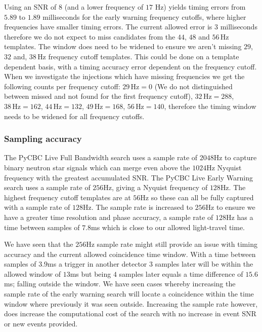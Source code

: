 %
Using an SNR of $8$ (and a lower frequency of $17$ Hz) yields timing errors from $5.89$ to $1.89$ milliseconds for the early warning frequency cutoffs, where higher frequencies have smaller timing errors. The current allowed error is $3$ milliseconds therefore we do not expect to miss candidates from the $44$, $48$ and $56 \, \text{Hz}$ templates. The window does need to be widened to ensure we aren't missing $29$, $32$ and, $38 \, \text{Hz}$ frequency cutoff templates. This could be done on a template dependent basis, with a timing accuracy error dependent on the frequency cutoff. When we investigate the injections which have missing frequencies we get the following counts per frequency cutoff: $29 \, \text{Hz} = 0$ (We do not distinguished between missed and not found for the first frequency cutoff), $32 \, \text{Hz} = 288$, $38 \, \text{Hz} = 162$, $44 \, \text{Hz} = 132$, $49 \, \text{Hz} = 168$, $56 \, \text{Hz} = 140$, therefore the timing window needs to be widened for all frequency cutoffs.

\subsubsection{\label{6:sec:sample_accuracy}Sampling accuracy}

The PyCBC Live Full Bandwidth search uses a sample rate of $2048$Hz to capture binary neutron star signals which can merge even above the $1024$Hz Nyquist frequency with the greatest accumulated SNR. The PyCBC Live Early Warning search uses a sample rate of $256$Hz, giving a Nyquist frequency of $128$Hz. The highest frequency cutoff templates are at $56$Hz so these can all be fully captured with a sample rate of $128$Hz. The sample rate is increased to $256$Hz to ensure we have a greater time resolution and phase accuracy, a sample rate of $128$Hz has a time between samples of $7.8$ms which is close to our allowed light-travel time.

We have seen that the $256$Hz sample rate might still provide an issue with timing accuracy and the current allowed coincidence time window. With a time between samples of $3.9$ms a trigger in another detector $3$ samples later will be within the allowed window of $13$ms but being $4$ samples later equals a time difference of $15.6$ms; falling outside the window. We have seen cases whereby increasing the sample rate of the early warning search will locate a coincidence within the time window where previously it was seen outside. Increasing the sample rate however, does increase the computational cost of the search with no increase in event SNR or new events provided.

